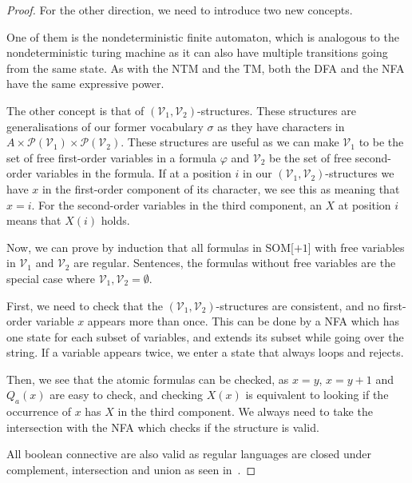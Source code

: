 \begin{proof}
    \vspace{5mm}

    For the other direction, we need to introduce two new concepts.

    One of them is the nondeterministic finite automaton, which is analogous to the nondeterministic turing machine as it can also have multiple transitions going from the same state.
    As with the NTM and the TM, both the DFA and the NFA have the same expressive power.

    The other concept is that of $(\mathcal{V}_1, \mathcal{V}_2)$-structures.
    These structures are generalisations of our former vocabulary $\sigma$ as they have characters in $A \times \mathcal{P}(\mathcal{V}_1)\times \mathcal{P}(\mathcal{V}_2)$.
    These structures are useful as we can make $\mathcal{V}_1$ to be the set of free first-order variables in a formula $\varphi$ and $\mathcal{V}_2$ be the set of free second-order variables in the formula.
    If at a position $i$ in our $(\mathcal{V}_1, \mathcal{V}_2)$-structures we have $x$ in the first-order component of its character, we see this as meaning that $x = i$.
    For the second-order variables in the third component, an $X$ at position $i$ means that $X(i)$ holds.

    Now, we can prove by induction that all formulas in SOM[$+1$] with free variables in $\mathcal{V}_1$ and $\mathcal{V}_2$ are regular.
    Sentences, the formulas without free variables are the special case where $\mathcal{V}_1, \mathcal{V}_2 = \emptyset$.

    First, we need to check that the $(\mathcal{V}_1, \mathcal{V}_2)$-structures are consistent, and no first-order variable $x$ appears more than once.
    This can be done by a NFA which has one state for each subset of variables, and extends its subset while going over the string.
    If a variable appears twice, we enter a state that always loops and rejects.

    Then, we see that the atomic formulas can be checked, as $x = y$, $x = y + 1$ and $Q_a(x)$ are easy to check, and checking $X(x)$ is equivalent to looking if the occurrence of $x$ has $X$ in the third component.
    We always need to take the intersection with the NFA which checks if the structure is valid.

    All boolean connective are also valid as regular languages are closed under complement, intersection and union as seen in~\cite{theory-cs}.


\end{proof}
